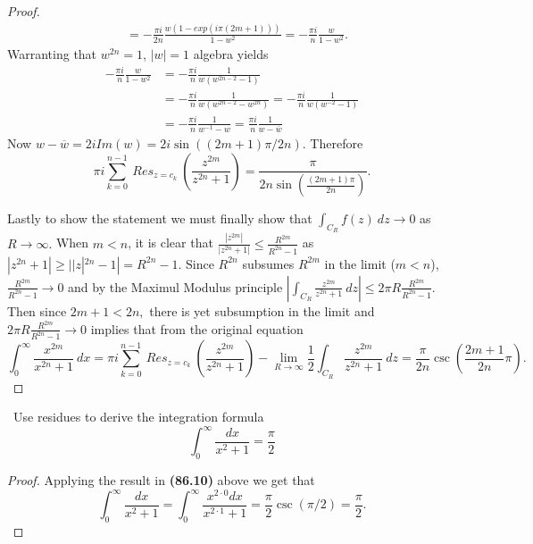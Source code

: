 \documentclass[11pt]{amsart}
\theoremstyle{definition}
\numberwithin{theorem}{section}
\numberwithin{definition}{section}
\numberwithin{equation}{section}
\newcommand{\parens}[1]{ \left( #1 \right) }
\begin{document}
\begin{proof}
\begin{equation*}
\begin{aligned}
			&= - \frac{\pi i}{2n} \frac{w(1-exp(i\pi (2m + 1)))}{1- w^2} = - \frac{\pi i}{n} \frac{w}{1- w^2}.
	\end{aligned}
	\end{equation*}
	Warranting that $w^{2n} = 1$, $|w| = 1$ algebra yields
	\begin{equation*}
	\begin{aligned}
		- \frac{\pi i}{n} \frac{w}{1- w^2} &= - \frac{\pi i}{n} \frac{1}{w(w^{2n-2}- 1)} \\
		&= - \frac{\pi i}{n} \frac{1}{w(w^{2n-2}- w^{2n})} 
		= - \frac{\pi i}{n} \frac{1}{w(w^{-2}- {1})} \\
		&= - \frac{\pi i}{n} \frac{1}{w^{-1}- w}
		= \frac{\pi i}{n} \frac{1}{w - \overline{w}}
	\end{aligned}
	\end{equation*}
	Now $w - \overline{w} = 2i Im(w) = 2i \sin\left((2m+1)\pi/2n\right).$ Therefore
	\begin{equation*}
			\pi i \sum_{k=0}^{n-1}\ Res_{z= c_k}\ \parens{\frac{z^{2m}}{z^{2n}+1}}  = \frac{\pi}{ 2n \sin\left(\frac{(2m+1)\pi}{2n}\right)}.
	\end{equation*}

	Lastly to show the statement we must finally show that $\int_{C_R} f(z)\ dz \to 0$ as $R \to \infty.$
	When $m < n$, it is clear that $\frac{|z^{2m}|}{|z^{2n}+1|} \leq  \frac{R^{2m}}{R^{2n}-1}$ as $|z^{2n} + 1| \geq ||z|^{2n} - 1| = R^{2n} -1.$ Since $R^{2n}$ subsumes $R^{2m}$ in the limit ($m < n$), $\frac{R^{2m}}{R^{2n}-1} \to 0$
	and by the Maximul Modulus principle $|\int_{C_R} \frac{z^{2m}}{z^{2n}+1}\ dz| \leq 2\pi R \frac{R^{2m}}{R^{2n}-1} $. Then since $2m +1 < 2n,$ there is yet subsumption in the limit and $ 2\pi R \frac{R^{2m}}{R^{2n}-1} \to 0$ implies that from the original equation
	\begin{equation*}
		 \int_0^\infty \frac{x^{2m}}{x^{2n}+1}\ dx = \pi i \sum_{k=0}^{n-1}\ Res_{z= c_k}\ \parens{\frac{z^{2m}}{z^{2n}+1}} - \lim_{R\to\infty } \frac{1}{2}\int_{C_R} \frac{z^{2m}}{z^{2n}+1}\ dz = \frac{\pi}{ 2n} \csc\left(\frac{2m+1}{2n}\pi\right).
	\end{equation*}
\end{proof}
\medskip {}\ Use residues to derive the integration formula
\begin{equation*}
	\int_0^\infty \frac{dx}{x^2 + 1} = \frac{\pi}{2}
\end{equation*}
\begin{proof}
	Applying the result in \textbf{(86.10)} above we get that
	\begin{equation*}
	\int_0^\infty \frac{dx}{x^2 + 1} = \int_0^\infty \frac{x^{2\cdot 0}dx}{x^{2\cdot 1} + 1} = \frac{\pi}{2} \csc(\pi/2) = \frac{\pi}{2}.
	\end{equation*}
\end{proof}
\end{document}
